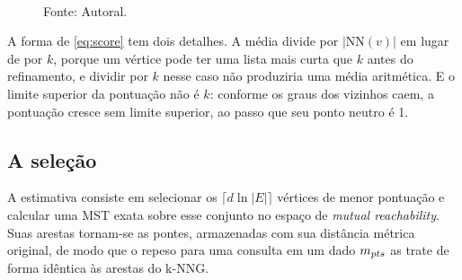 \begin{figure}[htb!]
\\
Fonte: Autoral.
\end{figure}

A forma de \eqref{eq:score} tem dois detalhes. A média divide por $|\mathrm{NN}(v)|$ em lugar de por $k$, porque um vértice pode ter uma lista mais curta que $k$ antes do refinamento, e dividir por $k$ nesse caso não produziria uma média aritmética. E o limite superior da pontuação não é $k$: conforme os graus dos vizinhos caem, a pontuação cresce sem limite superior, ao passo que seu ponto neutro é 1.\\

\subsection{A seleção\label{sec:selection}}

A estimativa consiste em selecionar os $\lceil d \ln |E| \rceil$ vértices de menor pontuação e calcular uma \ac{MST} exata sobre esse conjunto no espaço de \textit{mutual reachability}. Suas arestas tornam-se as pontes, armazenadas com sua distância métrica original, de modo que o repeso para uma consulta em um dado $m_{pts}$ as trate de forma idêntica às arestas do \ac{k-NNG}.\\

